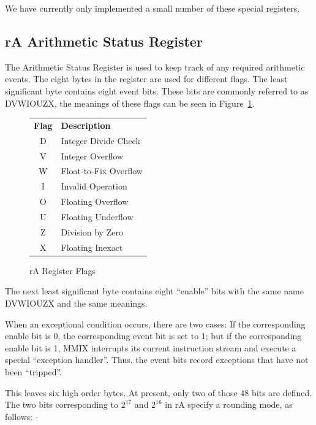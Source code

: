 \documentclass[a4paper,11pt]{report}
\newcommand{\head}[1]{\textbf{#1}}
\begin{document}
We have currently only implemented a small number of these special registers.

\subsection[Arithmetic Status Register]{rA Arithmetic Status Register}\label{rA}
The Arithmetic Status Register is used to keep track of any required arithmetic events. The eight bytes in the register are used for different flags. The least significant byte contains eight event bits. These bits are commonly referred to as DVWIOUZX, the meanings of these flags can be seen in Figure~\ref{fig:ra_reg_flags}.

\begin{figure}[!ht]
\begin{center}
\begin{tabular}{ c l }
\head{Flag} & \head{Description}\\
D & Integer Divide Check\\
V & Integer Overflow\\
W & Float-to-Fix Overflow\\
I & Invalid Operation\\
O & Floating Overflow\\
U & Floating Underflow\\
Z & Division by Zero\\
X & Floating Inexact\\
\end{tabular}
\end{center}
\caption{rA Register Flags}
\label{fig:ra_reg_flags}
\end{figure}

The next least significant byte contains eight ``enable'' bits with the same name DVWIOUZX and the same meanings.  

When an exceptional condition occurs, there are two cases: If the corresponding enable bit is 0, the corresponding event bit is set to 1; but if the corresponding enable bit is 1, MMIX interrupts its current instruction stream and execute a special ``exception handler''.  Thus, the event bits record exceptions that have not been ``tripped''.

This leaves six high order bytes.  At present, only  two of those 48 bits are defined. The two bits corresponding to 
\begin{math}
2^{17}
\end{math}
and 
\begin{math}
2^{16}
\end{math}
in rA specify a rounding mode, as follows: -
\end{document}
